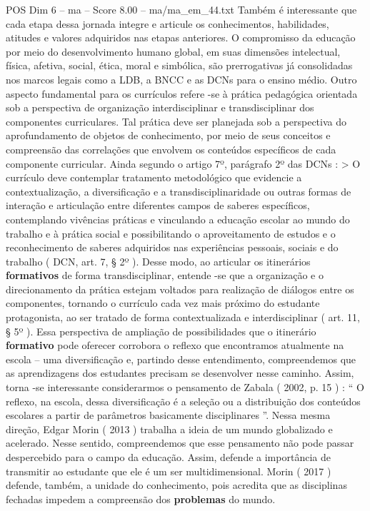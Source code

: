 \begin{textsample}{POS Dim 6 – ma – Score 8.00 – ma/ma\_em\_44.txt}
Também é interessante que cada etapa dessa jornada integre e articule os conhecimentos, habilidades, atitudes e valores adquiridos nas etapas anteriores.
O compromisso da educação por meio do desenvolvimento humano global, em suas dimensões intelectual, física, afetiva, social, ética, moral e simbólica, são prerrogativas já consolidadas nos marcos legais como a LDB, a BNCC e as DCNs para o ensino médio.
Outro aspecto fundamental para os currículos refere -se à prática pedagógica orientada sob a perspectiva de organização interdisciplinar e transdisciplinar dos componentes curriculares.
Tal prática deve ser planejada sob a perspectiva do aprofundamento de objetos de conhecimento, por meio de seus conceitos e compreensão das correlações que envolvem os conteúdos específicos de cada componente curricular.
Ainda segundo o artigo 7º, parágrafo 2º das DCNs : > O currículo deve contemplar tratamento metodológico que evidencie a contextualização, a diversificação e a transdisciplinaridade ou outras formas de interação e articulação entre diferentes campos de saberes específicos, contemplando vivências práticas e vinculando a educação escolar ao mundo do trabalho e à prática social e possibilitando o aproveitamento de estudos e o reconhecimento de saberes adquiridos nas experiências pessoais, sociais e do trabalho ( DCN, art. 7, § 2º ).
Desse modo, ao articular os itinerários \textbf{formativos} de forma transdisciplinar, entende -se que a organização e o direcionamento da prática estejam voltados para realização de diálogos entre os componentes, tornando o currículo cada vez mais próximo do estudante protagonista, ao ser tratado de forma contextualizada e interdisciplinar ( art. 11, § 5º ).
Essa perspectiva de ampliação de possibilidades que o itinerário \textbf{formativo} pode oferecer corrobora o reflexo que encontramos atualmente na escola – uma diversificação e, partindo desse entendimento, compreendemos que as aprendizagens dos estudantes precisam se desenvolver nesse caminho.
Assim, torna -se interessante considerarmos o pensamento de Zabala ( 2002, p. 15 ) : “ O reflexo, na escola, dessa diversificação é a seleção ou a distribuição dos conteúdos escolares a partir de parâmetros basicamente disciplinares ”.
Nessa mesma direção, Edgar Morin ( 2013 ) trabalha a ideia de um mundo globalizado e acelerado.
Nesse sentido, compreendemos que esse pensamento não pode passar despercebido para o campo da educação.
Assim, defende a importância de transmitir ao estudante que ele é um ser multidimensional.
Morin ( 2017 ) defende, também, a unidade do conhecimento, pois acredita que as disciplinas fechadas impedem a compreensão dos \textbf{problemas} do mundo.

\end{textsample}
